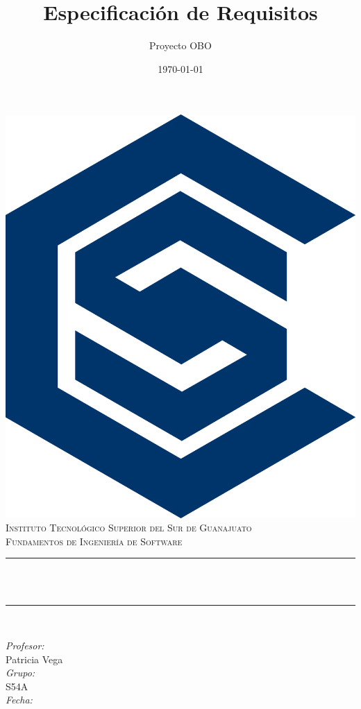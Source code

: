 \documentclass[12pt]{article}
\title{Especificación de Requisitos}
\author{Proyecto OBO}
\date{\today}
\makeatletter
\let\thetitle\@title
\let\thedate\@date
\makeatother
\begin{document}

\begin{titlepage}
  \centering
  \vspace*{0.5 cm}
  \includegraphics[scale = 0.6]{logo-sistemas}\\[1.0 cm]	%
  \textsc{\LARGE Instituto Tecnológico Superior del Sur de Guanajuato}\\[2.0 cm]	%
  \textsc{\Large Fundamentos de Ingeniería de Software}\\[0.5 cm]				%
  \rule{\linewidth}{0.2 mm} \\[0.4 cm]
  { \huge \bfseries \thetitle}\\
  \rule{\linewidth}{0.2 mm} \\[1.5 cm]
  
  \begin{minipage}{0.5\textwidth} %
    \begin{flushleft} \large
      \emph{Profesor:}\\
      Patricia Vega\\
      \emph{Grupo:} \\
      S54A \\
      \emph{Fecha:} \\
      \thedate     
    \end{flushleft}
  \end{minipage}~
  \begin{minipage}{0.4\textwidth}


\end{minipage}
\end{titlepage}
\end{document}
